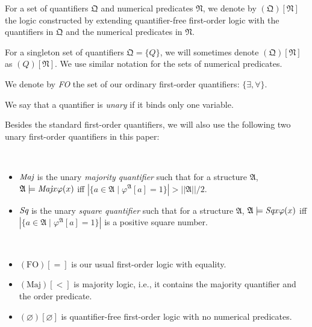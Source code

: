 \documentclass[a4paper,UKenglish,cleveref, autoref, thm-restate, anonymous]{lipics-v2021}
\begin{document}
\begin{definition}
    For a set of quantifiers $\mathfrak{Q}$ and numerical predicates $\mathfrak{N}$, we denote by $(\mathfrak{Q})[\mathfrak{N}]$ the logic constructed by extending quantifier-free first-order logic with the quantifiers in $\mathfrak{Q}$ and the numerical predicates in $\mathfrak{N}$. 

    For a singleton set of quantifiers $\mathfrak{Q} = \{Q\}$, we will sometimes denote $(\mathfrak{Q})[\mathfrak{N}]$ as $(Q)[\mathfrak{N}]$. We use similar notation for the sets of numerical predicates.

    We denote by \emph{FO} the set of our ordinary first-order quantifiers: $\{\exists, \forall\}$.
\end{definition}

\begin{definition}
    We say that a quantifier is \emph{unary} if it binds only one variable.
\end{definition}

Besides the standard first-order quantifiers, we will also use the following two unary first-order quantifiers in this paper:
\begin{definition}
    \,
    \begin{itemize}
        \item $\emph{Maj}$ is the unary \emph{majority quantifier} such that for a structure $\mathfrak{A}$, $\mathfrak{A} \models \emph{Maj} x \varphi(x)$ iff $|\{a \in \mathfrak{A} \mid \varphi^\mathfrak{A}[a] = 1\}| > ||\mathfrak{A}|| / 2$.
        \item $\emph{Sq}$ is the unary \emph{square quantifier} such that for a structure $\mathfrak{A}$, $\mathfrak{A} \models \emph{Sq} x \varphi(x)$ iff $|\{a \in \mathfrak{A} \mid \varphi^\mathfrak{A}[a] = 1\}|$ is a positive square number.
    \end{itemize}
\end{definition}

\begin{example}
    \,
    \begin{itemize}
        \item $(\text{FO})[=]$ is our usual first-order logic with equality. 
        \item $(\text{Maj})[<]$ is majority logic, i.e., it contains the majority quantifier and the order predicate. 
        \item $(\varnothing)[\varnothing]$ is quantifier-free first-order logic with no numerical predicates.
    \end{itemize}
\end{example}
\end{document}

